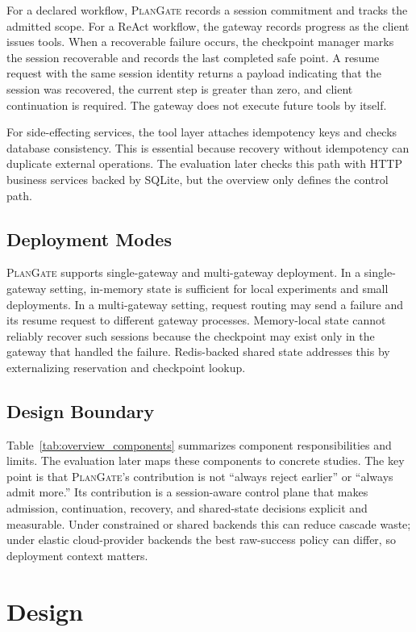 \documentclass[5p,times]{elsarticle}
\newcommand{\plangate}{\textsc{PlanGate}\xspace}
\begin{document}
For a declared workflow, \plangate records a session commitment and tracks the admitted scope. For a ReAct workflow, the gateway records progress as the client issues tools. When a recoverable failure occurs, the checkpoint manager marks the session recoverable and records the last completed safe point. A resume request with the same session identity returns a payload indicating that the session was recovered, the current step is greater than zero, and client continuation is required. The gateway does not execute future tools by itself.

For side-effecting services, the tool layer attaches idempotency keys and checks database consistency. This is essential because recovery without idempotency can duplicate external operations. The evaluation later checks this path with HTTP business services backed by SQLite, but the overview only defines the control path.

\subsection{Deployment Modes}

\plangate supports single-gateway and multi-gateway deployment. In a single-gateway setting, in-memory state is sufficient for local experiments and small deployments. In a multi-gateway setting, request routing may send a failure and its resume request to different gateway processes. Memory-local state cannot reliably recover such sessions because the checkpoint may exist only in the gateway that handled the failure. Redis-backed shared state addresses this by externalizing reservation and checkpoint lookup.

\subsection{Design Boundary}

Table~\ref{tab:overview_components} summarizes component responsibilities and limits. The evaluation later maps these components to concrete studies. The key point is that \plangate's contribution is not ``always reject earlier'' or ``always admit more.'' Its contribution is a session-aware control plane that makes admission, continuation, recovery, and shared-state decisions explicit and measurable. Under constrained or shared backends this can reduce cascade waste; under elastic cloud-provider backends the best raw-success policy can differ, so deployment context matters.

\section{Design}
\label{sec:design}
\end{document}
